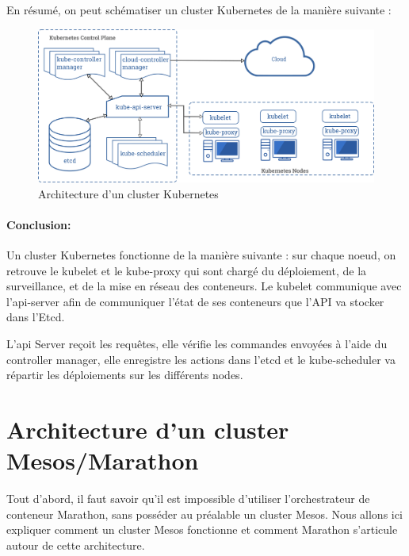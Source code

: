 \documentclass[11pt,fleqn]{book} %
\begin{document}
En résumé, on peut schématiser un cluster Kubernetes de la manière suivante :

\begin{figure}[H]\centering
\renewcommand{\figurename}{Schéma}
\includegraphics[scale=0.09]{Pictures/Comparaison/Kubernetes-cluster-archi.png}
\captionsetup{margin=1.5cm,format=hang,justification=justified}
\caption[]{Architecture d'un cluster Kubernetes \newline}
\end{figure}



\begin{interrupt}
\paragraph{Conclusion:}
Un cluster Kubernetes fonctionne de la manière suivante :
sur chaque noeud, on retrouve le kubelet et le kube-proxy qui sont chargé du déploiement, de la surveillance, et de la mise en réseau des conteneurs. Le kubelet communique avec l'api-server afin de communiquer l'état de ses conteneurs que l'API va stocker dans l'Etcd.\newline

L'api Server reçoit les requêtes, elle vérifie les commandes envoyées à l'aide du controller manager, elle enregistre les actions dans l'etcd et le kube-scheduler va répartir les déploiements sur les différents nodes.
\end{interrupt}

\section*{Architecture d'un cluster Mesos/Marathon}
Tout d'abord, il faut savoir qu'il est impossible d'utiliser l'orchestrateur de conteneur Marathon, sans posséder au préalable un cluster Mesos. Nous allons ici expliquer comment un cluster Mesos fonctionne et comment Marathon s'articule autour de cette architecture.
\end{document}
